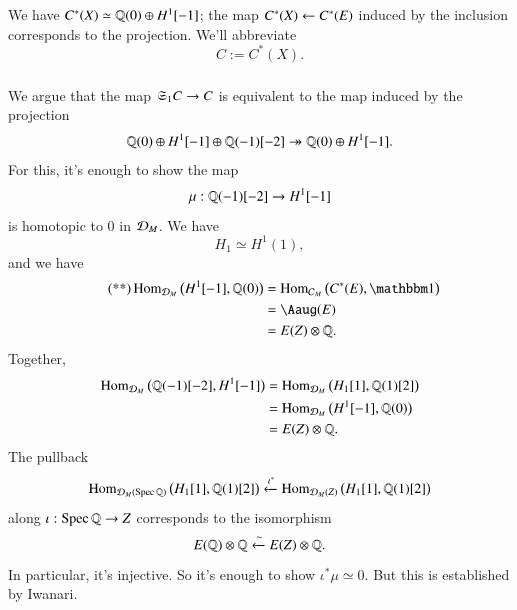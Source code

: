 We have $C^*(X) \simeq \mathbb{Q}(0) \oplus H^1[-1]$; the map $C^*(X) \leftarrow C^*(E)$ induced by the inclusion corresponds to the projection. We'll abbreviate
\[
C := C^*(X).
\]

\subsubsection{}
\label{EB13}
We argue that the map $\mathfrak{S}_1C \to C$ is equivalent to the map induced by the projection
\[
\mathbb{Q}(0) \oplus H^1[-1] \oplus \mathbb{Q}(-1)[-2]
\twoheadrightarrow
\mathbb{Q}(0) \oplus H^1[-1].
\]
For this, it's enough to show the map
\[
\mu:\mathbb{Q}(-1)[-2] \to H^1[-1]
\]
is homotopic to 0 in $\mathcal{D}_M$. We have
\[
\tag{*}
H_1 \simeq H^1(1),
\]
and we have
\begin{align*}
\tag{**}
\Hom_{\Dd_M} \big(H^1[-1], \QQ(0) \big)
&= \Hom_{\Cc_M} \big(C^*(E), \one  \big)
\\
&= \Aaug(E)
\\
&=E(Z) \otimes \QQ.
\end{align*}
Together,
\begin{align*}
\operatorname{Hom}_{\mathcal{D}_M} \big( \mathbb{Q}(-1)[-2], H^1[-1] \big)
&=
\operatorname{Hom}_{\mathcal{D}_M} \big( H_1[1], \mathbb{Q}(1)[2] \big)
\\
&= \operatorname{Hom}_{\mathcal{D}_M} \big( H^1[-1], \mathbb{Q}(0) \big)
\\
&= E(Z) \otimes \mathbb{Q}.
\end{align*}
The pullback
\[
\operatorname{Hom}_{\mathcal{D}_M(\operatorname{Spec} \mathbb{Q})}
\big( H_1[1], \mathbb{Q}(1)[2] \big)
\xleftarrow{\iota^*}
\operatorname{Hom}_{\mathcal{D}_M(Z)} \big( H_1[1], \mathbb{Q}(1)[2] \big)
\]
along $\iota: \operatorname{Spec} \mathbb{Q} \to Z$ corresponds to the isomorphism
\[
E(\mathbb{Q}) \otimes \mathbb{Q} \xleftarrow{\sim}
E(Z) \otimes \mathbb{Q}.
\]
In particular, it's injective. So it's enough to show $\iota^*\mu \simeq 0$. But this is established by Iwanari. 

